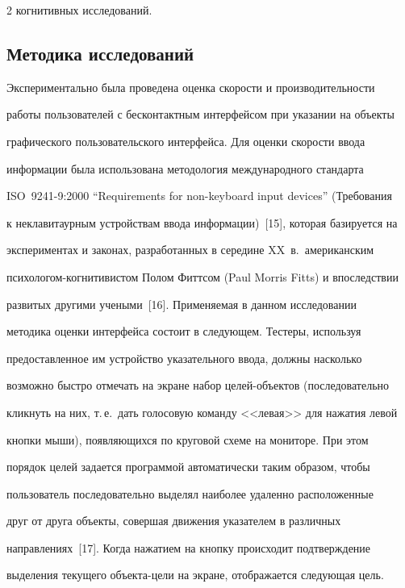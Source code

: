 \begin{multicols}{2}
когнитивных исследований.





\subsection{Методика исследований}





  Экспериментально была проведена оценка скорости и производительности 


работы пользователей с бесконтактным интерфейсом при указании на объекты 


графического пользовательского интерфейса. Для оценки скорости ввода 


информации была использована методология международного стандарта 


ISO~9241-9:2000 ``Requirements for non-keyboard input devices'' (Требования 


к неклавитаурным устройствам ввода информации)~[15], которая базируется на 


экспериментах и законах, разработанных в середине XX~в.\ американским 


пси\-хо\-ло\-гом-когни\-ти\-ви\-стом Полом Фиттсом (Paul Morris Fitts) и впоследствии 


развитых другими учеными~[16]. Применяемая в данном исследовании 


методика оценки интерфейса состоит в следующем. Тестеры, используя 


предоставленное им устройство указательного ввода, должны насколько 


возможно быстро отмечать на экране набор целей-объектов (последовательно 


кликнуть на них, т.\,е.\ дать голосовую команду <<левая>> для нажатия левой 


кнопки мыши), появляющихся по круговой схеме на мониторе. При этом 


порядок целей задается программой автоматически таким образом, чтобы 


пользователь последовательно выделял наиболее удаленно расположенные 


друг от друга объекты, совершая движения указателем в различных 


направлениях~[17]. Когда нажатием на кнопку происходит подтверждение 


выделения текущего объекта-цели на экране, отображается следующая цель. 



\end{multicols}

